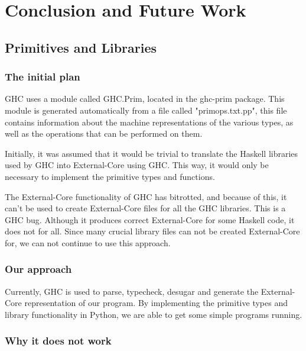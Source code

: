 
\chapter{Conclusion and Future Work}
\label{chap:conc}







\section{Primitives and Libraries}

\subsection{The initial plan}

GHC uses a module called GHC.Prim, located in the ghc-prim package. This
module is generated automatically from a file called "primops.txt.pp", this file
contains information about the machine representations of the various types, as
well as the operations that can be performed on them.

Initially, it was assumed that it would be trivial to translate the Haskell
libraries used by GHC into External-Core using GHC. This way, it would only 
be necessary to implement the primitive types and functions.

The External-Core functionality of GHC has bitrotted, and because of this, it can't be
used to create External-Core files for all the GHC libraries. This is a GHC bug. 
Although it produces correct
External-Core for some Haskell code, it does not for all. Since many crucial library files
can not be created External-Core for, we can not continue to use this approach.

\subsection{Our approach}

Currently, GHC is used to parse, typecheck, desugar and generate the 
External-Core representation of our program. By implementing the
primitive types and library functionality in Python, we are able to
get some simple programs running.


\subsection{Why it does not work}


